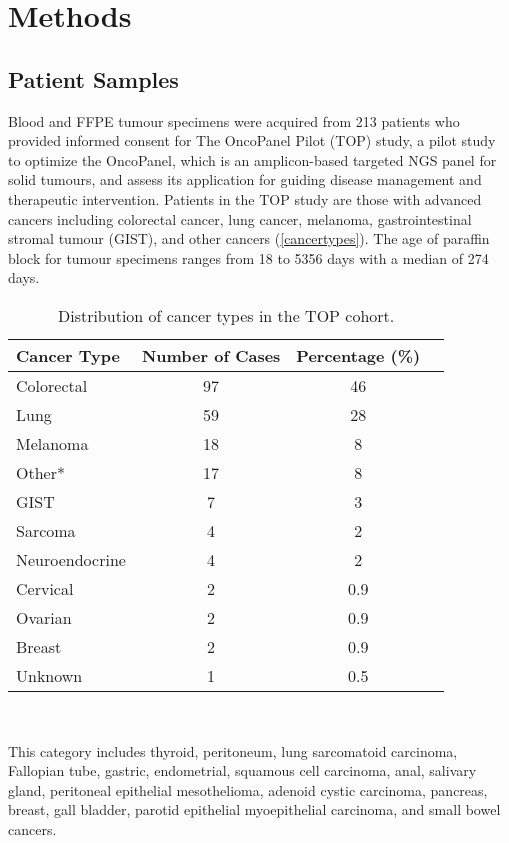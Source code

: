 \documentclass{bmcart}
\begin{document}

\section*{Methods}

\subsection*{Patient Samples}
Blood and FFPE tumour specimens were acquired from 213 patients who provided informed consent for The OncoPanel Pilot (TOP) study, a pilot study to optimize the OncoPanel, which is an amplicon-based targeted NGS panel for solid tumours, and assess its application for guiding disease management and therapeutic intervention. Patients in the TOP study are those with advanced cancers including colorectal cancer, lung cancer, melanoma, gastrointestinal stromal tumour (GIST), and other cancers (\autoref{cancertypes}). The age of paraffin block for tumour specimens ranges from 18 to 5356 days with a median of 274 days.

\begin{table}[H]
\caption{Distribution of cancer types in the TOP cohort.}\label{cancertypes}
      \begin{tabular}{lccc}
        \hline
        Cancer Type & Number of Cases & Percentage (\%) \\ \hline
        Colorectal & 97 & 46 \\
        Lung & 59 & 28 \\
        Melanoma & 18 & 8 \\
				Other* & 17 & 8 \\
				GIST & 7 & 3 \\
				Sarcoma & 4 & 2 \\
				Neuroendocrine & 4 & 2 \\
				Cervical & 2 & 0.9 \\
				Ovarian & 2 & 0.9 \\
				Breast & 2 & 0.9 \\
				Unknown & 1 & 0.5 \\ \hline
      \end{tabular} \\
\raggedright
{\small *This category includes thyroid, peritoneum, lung sarcomatoid carcinoma, Fallopian tube, gastric, endometrial, squamous cell carcinoma, anal, salivary gland, peritoneal epithelial mesothelioma, adenoid cystic carcinoma, pancreas, breast, gall bladder, parotid epithelial myoepithelial carcinoma, and small bowel cancers.}
\end{table}
\end{document}
